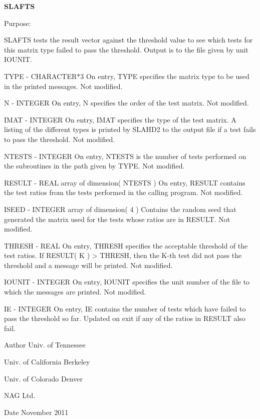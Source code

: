 {\bfseries S\+L\+A\+F\+T\+S} 

\begin{DoxyParagraph}{Purpose\+: }
\begin{DoxyVerb}    SLAFTS tests the result vector against the threshold value to
    see which tests for this matrix type failed to pass the threshold.
    Output is to the file given by unit IOUNIT.\end{DoxyVerb}
 \begin{DoxyVerb}  TYPE   - CHARACTER*3
           On entry, TYPE specifies the matrix type to be used in the
           printed messages.
           Not modified.

  N      - INTEGER
           On entry, N specifies the order of the test matrix.
           Not modified.

  IMAT   - INTEGER
           On entry, IMAT specifies the type of the test matrix.
           A listing of the different types is printed by SLAHD2
           to the output file if a test fails to pass the threshold.
           Not modified.

  NTESTS - INTEGER
           On entry, NTESTS is the number of tests performed on the
           subroutines in the path given by TYPE.
           Not modified.

  RESULT - REAL               array of dimension( NTESTS )
           On entry, RESULT contains the test ratios from the tests
           performed in the calling program.
           Not modified.

  ISEED  - INTEGER            array of dimension( 4 )
           Contains the random seed that generated the matrix used
           for the tests whose ratios are in RESULT.
           Not modified.

  THRESH - REAL
           On entry, THRESH specifies the acceptable threshold of the
           test ratios.  If RESULT( K ) > THRESH, then the K-th test
           did not pass the threshold and a message will be printed.
           Not modified.

  IOUNIT - INTEGER
           On entry, IOUNIT specifies the unit number of the file
           to which the messages are printed.
           Not modified.

  IE     - INTEGER
           On entry, IE contains the number of tests which have
           failed to pass the threshold so far.
           Updated on exit if any of the ratios in RESULT also fail.\end{DoxyVerb}
 
\end{DoxyParagraph}
\begin{DoxyAuthor}{Author}
Univ. of Tennessee 

Univ. of California Berkeley 

Univ. of Colorado Denver 

N\+A\+G Ltd. 
\end{DoxyAuthor}
\begin{DoxyDate}{Date}
November 2011 
\end{DoxyDate}
\hypertarget{group__single__eig_gaed2b768a1738ac80fc4df77690614cd9}{}
